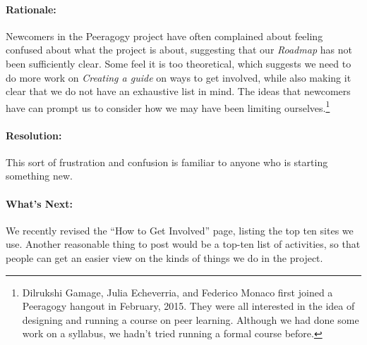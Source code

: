\paragraph{Rationale:} Newcomers in the Peeragogy project have often complained
about feeling confused about what the project is about, suggesting that our \emph{Roadmap}
has not been sufficiently clear.  Some feel it is too theoretical, which suggests
we need to do more work on \emph{Creating a guide} on ways to get involved, while also
making it clear that we do not have an exhaustive list in mind.  The ideas that newcomers
have can prompt us to consider how we may have been limiting ourselves.\footnote{Dilrukshi Gamage, Julia Echeverria, and Federico Monaco first joined a Peeragogy hangout in February, 2015.  They were all interested in the idea of designing and running a course on peer learning.  Although we had done some work on a syllabus, we hadn't tried  running a formal course before.}

\paragraph{Resolution:}
This sort of frustration and confusion is familiar to anyone who is starting something new.

\paragraph{What's Next:} We recently revised the ``How to Get Involved''
page, listing the top ten sites we use. Another reasonable thing to post
would be a top-ten list of activities, so that people can get an easier
view on the kinds of things we do in the project.
